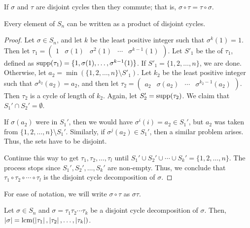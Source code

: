 If $\sigma$ and $\tau$ are disjoint cycles then they commute; that is, $\sigma \circ \tau = \tau \circ \sigma$.

\begin{proposition}
    Every element of $S_{n}$ can be written as a product of disjoint cycles.
\end{proposition}

\begin{proof}
    Let $\sigma \in S_{n}$, and let $k$ be the least positive integer such that $\sigma^{k}(1) = 1$. Then let $\tau_{1} = \begin{pmatrix}
        1 & \sigma(1) & \sigma^{2}(1) & \cdots & \sigma^{k-1}(1)
    \end{pmatrix}$. Let $S'_{1}$ be the  of $\tau_{1}$, defined as $\operatorname{supp} (\tau_{1}) = \{1,\sigma(1),\ldots,\sigma^{k-1}(1)\}$. If $S'_{1} = \{1,2,\ldots,n\}$, we are done. Otherwise, let $a_{2} = \min (\{1,2,\ldots,n\}\setminus S'_{1})$. Let $k_{2}$ be the least positive integer such that $\sigma^{k_{2}}(a_{2}) = a_{2}$, and then let $\tau_{2} = \begin{pmatrix}
        a_{2} & \sigma(a_{2}) & \cdots & \sigma^{k_{2}-1}(a_{2})
    \end{pmatrix}$. Then $\tau_{2}$ is a cycle of length of $k_{2}$. Again, let $S_{2}' = \operatorname{supp}(\tau_{2})$. We claim that $S_{1}' \cap S_{2}' = \emptyset$.

    If $\sigma(a_{2})$ were in $S_{1}'$, then we would have $\sigma^{i}(i) = a_{2} \in S_{1}'$, but $a_{2}$ was taken from $\{1,2,\ldots,n\}\setminus S_{1}'$. Similarly, if $\sigma^{j}(a_{2}) \in S_{1}'$, then a similar problem arises. Thus, the sets have to be disjoint.

    Continue this way to get $\tau_{1},\tau_{2},\ldots,\tau_{l}$ until $S_{1}' \cup S_{2}' \cup \cdots \cup S_{k}' = \{1,2,\ldots,n\}$. The process stops since $S_{1}',S_{2}',\ldots,S_{k}'$ are non-empty. Thus, we conclude that $\tau_{1} \circ \tau_{2} \circ \cdots \circ \tau_{l}$ is the disjoint cycle decomposition of $\sigma$.
\end{proof}

For ease of notation, we will write $\sigma \circ \tau$ as $\sigma\tau$.

\begin{proposition}
    Let $\sigma \in S_{n}$ and $\sigma = \tau_{1}\tau_{2}\cdots\tau_{k}$ be a disjoint cycle decomposition of $\sigma$. Then, $\left| \sigma \right| = \operatorname{lcm} (\left| \tau_{1} \right|, \left| \tau_{2} \right|,\ldots,\left| \tau_{k} \right|)$.
\end{proposition}

